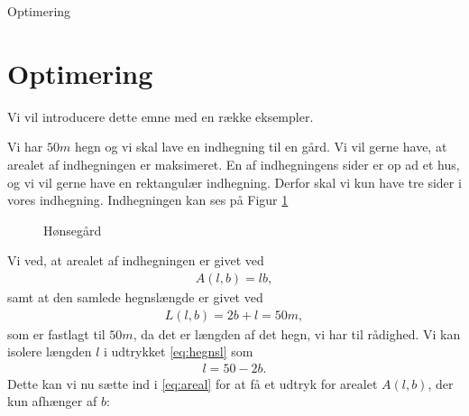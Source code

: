 

\begin{center}
\Huge
Optimering
\end{center}

\section*{Optimering}

Vi vil introducere dette emne med en række eksempler. 
\begin{exa}\label{exa:exa1}
Vi har $50m$ hegn og vi skal lave en indhegning til en gård. Vi vil gerne have, at arealet af indhegningen er maksimeret. En af indhegningens sider er op ad et hus, og vi vil gerne have en rektangulær indhegning. Derfor skal vi kun have tre sider i vores indhegning. Indhegningen kan ses på Figur \ref{fig:indh}
\begin{figure}[H]
\centering
{}
\caption{Hønsegård}
\label{fig:indh}
\end{figure}
Vi ved, at arealet af indhegningen er givet ved 
\begin{align}\label{eq:areal}
A(l,b) = lb,
\end{align}
samt at den samlede hegnslængde er givet ved 
\begin{align}\label{eq:hegnsl}
L(l,b) = 2b+l = 50m,
\end{align}
som er fastlagt til $50m$, da det er længden af det hegn, vi har til rådighed. Vi kan isolere længden $l$ i udtrykket \eqref{eq:hegnsl} som
\begin{align}\label{eq:lsomfb}
l = 50-2b.
\end{align}
Dette kan vi nu sætte ind i \eqref{eq:areal} for at få et udtryk for arealet $A(l,b)$, der kun afhænger af $b$:
\begin{align*}

\end{align*}
\end{exa}
